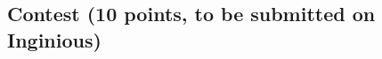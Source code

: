 \documentclass[11pt,a4paper]{report}
\begin{document}
\begin{answers}[20cm]
\end{answers}

\begin{answers}[23cm]
\end{answers}

\begin{answers}[23cm]
\end{answers}


\subsection{Contest (10 points, to be submitted on Inginious)}
\end{document}
